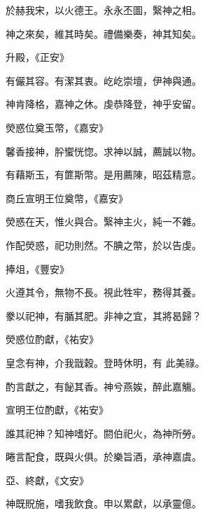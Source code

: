 \begin{pinyinscope}
 於赫我宋，以火德王。永永丕圖，繄神之相。



 神之來矣，維其時矣。禮備樂奏，神其知矣。



 升殿，《正安》



 有儼其容。有潔其衷。屹屹崇壇，伊神與通。



 神肯降格，嘉神之休。虔恭降登，神乎安留。



 熒惑位奠玉幣，《嘉安》



 馨香接神，肸蠁恍惚。求神以誠，薦誠以物。



 有藉斯玉，有篚斯幣。是用薦陳，昭茲精意。



 商丘宣明王位奠幣，《嘉安》



 熒惑在天，惟火與合。繄神主火，純一不雜。



 作配熒惑，祀功則然。不腆之幣，於以告虔。



 捧俎，《豐安》



 火遵其令，無物不長。視此牲牢，務得其養。



 豢以祀神，有腯其肥。非神之宜，其將曷歸？



 熒惑位酌獻，《祐安》



 皇念有神，介我戩穀。登時休明，有
 此美祿。



 酌言獻之，有飶其香。神兮燕娭，醉此嘉觴。



 宣明王位酌獻，《祐安》



 誰其祀神？知神嗜好。閼伯祀火，為神所勞。



 睠言配食，既與火俱。於樂旨酒，承神嘉虞。



 亞、終獻，《文安》



 神既貺施，嗜我飲食。申以累獻，以承靈億。




\end{pinyinscope}
